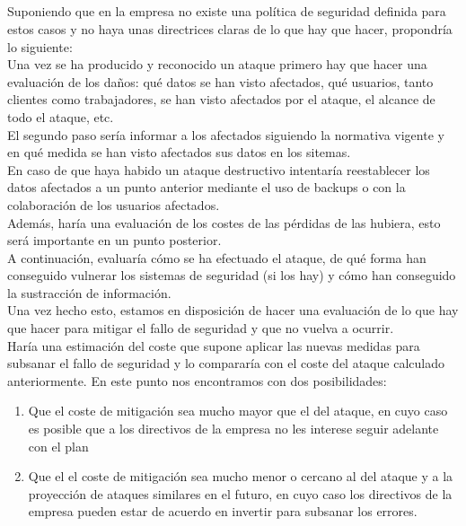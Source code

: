 \documentclass[a4paper,oneside]{article}
\begin{document}
\subsection{}
Suponiendo que en la empresa no existe una política de seguridad definida para estos casos y no haya unas directrices claras de lo que hay que hacer, propondría lo siguiente:\\

Una vez se ha producido y reconocido un ataque primero hay que hacer una evaluación de los daños: qué datos se han visto afectados, qué usuarios, tanto clientes como trabajadores, se han visto afectados por el ataque, el alcance de todo el ataque, etc.\\

El segundo paso sería informar a los afectados siguiendo la normativa vigente y en qué medida se han visto afectados sus datos en los sitemas.\\
En caso de que haya habido un ataque destructivo intentaría reestablecer los datos afectados a un punto anterior mediante el uso de backups o con la colaboración de los usuarios afectados.\\
Además, haría una evaluación de los costes de las pérdidas de las hubiera, esto será importante en un punto posterior.\\

A continuación, evaluaría cómo se ha efectuado el ataque, de qué forma han conseguido vulnerar los sistemas de seguridad (si los hay) y cómo han conseguido la sustracción de información.\\
Una vez hecho esto, estamos en disposición de hacer una evaluación de lo que hay que hacer para mitigar el fallo de seguridad y que no vuelva a ocurrir.\\

Haría una estimación del coste que supone aplicar las nuevas medidas para subsanar el fallo de seguridad y lo compararía con el coste del ataque calculado anteriormente. En este punto nos encontramos con dos posibilidades:\\
\begin{enumerate}
\item Que el coste de mitigación sea mucho mayor que el del ataque, en cuyo caso es posible que a los directivos de la empresa no les interese seguir adelante con el plan
\item Que el el coste de mitigación sea mucho menor o cercano al del ataque y a la proyección de ataques similares en el futuro, en cuyo caso los directivos de la empresa pueden estar de acuerdo en invertir para subsanar los errores.
\end{enumerate}
\end{document}
